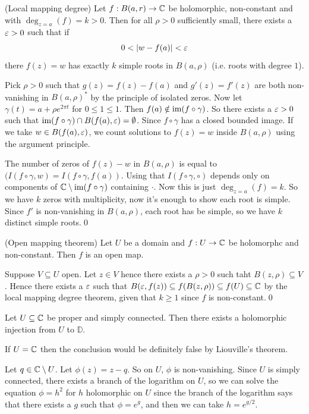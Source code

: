 \documentclass{article}
\begin{document}
\begin{theorem}
	(Local mapping degree) Let $ f:B(a,r)\to \mathbb{C} $ be holomorphic, non-constant and with $ \deg_{z=a}(f)=k>0 $. Then for all $ \rho>0 $ sufficiently small, there exists a $ \varepsilon>0 $ such that if
	\[
	  0<|w-f(a)|<\ep
	\]
	there $ f(z)=w $ has exactly $ k $ simple roots in $ B(a,\rho) $ (i.e. roots with degree $ 1 $).
\end{theorem}
\pf Pick $ \rho>0 $ such that $ g(z) = f(z) -f(a) $ and $ g'(z) = f'(z) $ are both non-vanishing in $ B(a,\rho)^* $ by the principle of isolated zeros. Now let $ \gamma(t) = a + \rho e^{2\pi t}  $ for $ 0\le 1 \le 1 $. Then $ f(a)\notin \operatorname{im}(f\circ \gamma) $. So there exists a $ \varepsilon>0 $ such that $ \operatorname{im}(f\circ \gamma) \cap B(f(a), \varepsilon) = \emptyset $. Since $ f\circ\gamma $ has a closed bounded image. If we take $ w\in B(f(a),\varepsilon) $, we count solutions to $ f(z)=w $ inside $  B(a,\rho) $ using the argument principle.\par
The number of zeros of $ f(z)-w $ in $ B(a,\rho) $ is equal to $ (I(f\circ \gamma,w) = I(f\circ \gamma,f(a)) $. Using that $ I(f\circ \gamma,\circ) $ depends only on components of $ \mathbb{C}\setminus \operatorname{im}(f\circ \gamma) $ containing $ \cdot $. Now this is just $ \deg_{z=a}(f) = k $. So we have $ k $ zeros with multiplicity, now it's enough to show each root is simple. Since $ f' $ is non-vanishing in $ B(a,\rho) $, each root has be simple, so we have $ k $ distinct simple roots.\qed
\begin{corollary}
	(Open mapping theorem) Let $ U $ be a domain and $ f:U\to \mathbb{C} $ be holomorphc and non-constant. Then $ f $ is an open map.
\end{corollary}
\pf Suppose $ V\subseteq U $ open. Let $ z\in V $ hence there exists a $ \rho>0 $ such taht $ B(z,\rho) \subseteq V $. Hence there exists a $ \varepsilon $ such that $ B(\varepsilon, f(z)) \subseteq f(B(z,\rho)) \subseteq f(U)\subseteq \mathbb{C} $ by the local mapping degree theorem, given that $ k\ge 1 $ since $ f $ is non-constant.\qed
\begin{corollary}
  Let $ U\subseteq \mathbb{C} $ be proper and simply connected. Then there exists a holomorphic injection from $ U $ to $ \mathbb D $.
\end{corollary}
\begin{remark}
  If $ U=\mathbb{C} $ then the conclusion would be definitely false by Liouville's theorem.
\end{remark}
\pf Let $ q\in \mathbb{C}\setminus U $. Let $ \phi(z) = z-q $. So on $ U $, $ \phi $ is non-vanishing. Since $ U $ is simply connected, there exists a branch of the logarithm on $ U $, so we can solve the equation $ \phi = h^2 $ for $ h $ holomorphic on $ U $ since the branch of the logarithm says that there exists a $ g $ such that $ \phi = e^g $, and then we can take $ h = e^{g/2} $.\par
\end{document}
